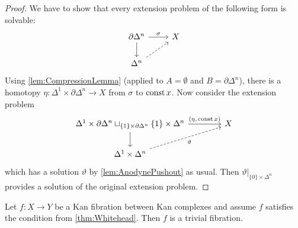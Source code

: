 \begin{proof}
	We have to show that every extension problem of the following form is solvable:
	\begin{equation*}
		\begin{tikzcd}
			\partial\Delta^n\rar["\sigma"]\dar& X\\
			\Delta^n\urar[dashed] &
		\end{tikzcd}
	\end{equation*}
	Using \cref{lem:CompressionLemma} (applied to $A=\emptyset$ and $B=\partial\Delta^n$), there is a homotopy $\eta\colon \Delta^1\times\partial\Delta^n\rightarrow X$ from $\sigma$ to $\operatorname{const} x$. Now consider the extension problem
	\begin{equation*}
		\begin{tikzcd}[column sep=4em]
			\Delta^1\times\partial\Delta^n\sqcup_{\{1\}\times\partial\Delta^n}\{1\}\times\Delta^n\dar\rar["{(\eta,\,\const x)}"] & X\\
			\Delta^1\times\Delta^n\urar[dashed,"\vartheta"',end anchor=202] &
		\end{tikzcd}
	\end{equation*}
	which has a solution $\vartheta$ by \cref{lem:AnodynePushout} as usual. Then $\vartheta|_{\{0\}\times\Delta^n}$ provides a solution of the original extension problem.
\end{proof}
\begin{lem}\label{lem:TrivialFibration}
	Let $f\colon X\rightarrow Y$ be a Kan fibration between Kan complexes and assume $f$ satisfies the condition from \cref{thm:Whitehead}. Then $f$ is a trivial fibration.
\end{lem}
